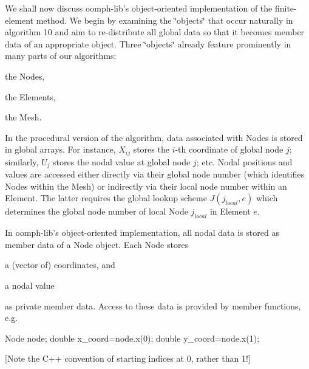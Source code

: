 We shall now discuss {\ttfamily oomph-\/lib's} object-\/oriented implementation of the finite-\/element method. We begin by examining the \char`\"{}objects\char`\"{} that occur naturally in algorithm 10 and aim to re-\/distribute all global data so that it becomes member data of an appropriate object. Three \char`\"{}objects\char`\"{} already feature prominently in many parts of our algorithms\-:
\begin{DoxyItemize}
\item the Nodes,
\item the Elements,
\item the Mesh.
\end{DoxyItemize}

In the procedural version of the algorithm, data associated with Nodes is stored in global arrays. For instance, $ X_{ij}$ stores the $i$-\/th coordinate of global node $ j $; similarly, $ U_{j} $ stores the nodal value at global node $j$; etc. Nodal positions and values are accessed either directly via their global node number (which identifies Nodes within the Mesh) or indirectly via their local node number within an Element. The latter requires the global lookup scheme $ J(j_{local},e)$ which determines the global node number of local Node $j_{local}$ in Element $e$.

In {\ttfamily oomph-\/lib's} object-\/oriented implementation, all nodal data is stored as member data of a Node object. Each Node stores
\begin{DoxyItemize}
\item a (vector of) coordinates, and
\item a nodal value
\end{DoxyItemize}as private member data. Access to these data is provided by member functions, e.\-g. 
\begin{DoxyCode}
Node node;
\textcolor{keywordtype}{double} x\_coord=node.x(0);
\textcolor{keywordtype}{double} y\_coord=node.x(1);
\end{DoxyCode}


\mbox{[}Note the C++ convention of starting indices at 0, rather than 1!\mbox{]}

